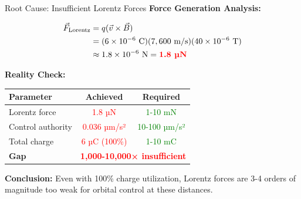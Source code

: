 \documentclass[aspectratio=169]{beamer}
\begin{document}
\begin{frame}{Root Cause: Insufficient Lorentz Forces}
\textbf{Force Generation Analysis:}

\begin{align}
\vec{F}_{\text{Lorentz}} &= q(\vec{v} \times \vec{B}) \\
&= (6 \times 10^{-6}\text{ C})(7,600\text{ m/s})(40 \times 10^{-6}\text{ T}) \\
&\approx 1.8 \times 10^{-6}\text{ N} = \textcolor{red}{\textbf{1.8 µN}}
\end{align}

\vspace{0.3cm}
\textbf{Reality Check:}
\begin{center}
\begin{tabular}{lcc}
\toprule
\textbf{Parameter} & \textbf{Achieved} & \textbf{Required} \\
\midrule
Lorentz force & \textcolor{red}{1.8 µN} & \textcolor{green}{1-10 mN} \\
Control authority & \textcolor{red}{0.036 µm/s²} & \textcolor{green}{10-100 µm/s²} \\
Total charge & \textcolor{red}{6 µC (100\%)} & \textcolor{green}{1-10 mC} \\
\midrule
\textbf{Gap} & \multicolumn{2}{c}{\textcolor{red}{\textbf{1,000-10,000× insufficient}}} \\
\bottomrule
\end{tabular}
\end{center}

\vspace{0.3cm}
\textbf{Conclusion:} Even with 100\% charge utilization, Lorentz forces are 3-4 orders of magnitude too weak for orbital control at these distances.
\end{frame}
\end{document}
